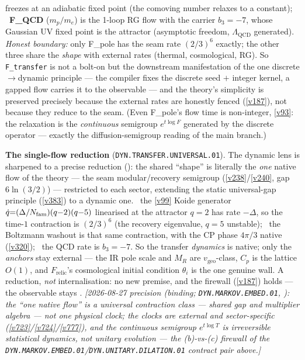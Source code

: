freezes at an adiabatic fixed point (the comoving number relaxes to a constant); \mE\ \textbf{F\_QCD} ($m_p/m_e$)
is the 1-loop RG flow with the carrier $b_3{=}-7$, whose Gaussian UV fixed point is the attractor (asymptotic
freedom, $\Lambda_{\mathrm{QCD}}$ generated). \emph{Honest boundary:} only F\_pole has the seam rate $(2/3)^6$
exactly; the other three share the \emph{shape} with external rates (thermal, cosmological, RG). So
\texttt{F\_transfer} is not a bolt-on but the downstream manifestation of the one discrete$\to$dynamic principle
--- the compiler fixes the discrete seed $+$ integer kernel, a gapped flow carries it to the observable --- and
the theory's simplicity is preserved precisely because the external rates are honestly fenced (\vref{v187}), not
because they reduce to the seam. (Even F\_pole's flow time is non-integer, \vref{v93}: the relaxation is the
\emph{continuous} semigroup $e^{t\log F}$ generated by the discrete operator --- exactly the diffusion-semigroup
reading of the main branch.)
\par\smallskip\noindent\textbf{The single-flow reduction} (\texttt{DYN.TRANSFER.UNIVERSAL.01}). The dynamic
lens is sharpened to a precise reduction (): the shared
``shape'' is literally the \emph{one} native flow of the theory --- the seam modular/recovery semigroup
(\vref{v238}/\vref{v240}, gap $6\ln(3/2)$) --- restricted to each sector, extending the static
universal-gap principle (\vref{v383}) to a dynamic one. \mE\ the \vref{v99} Koide generator
$\dot q{=}(\Delta/N_{\mathrm{fam}})(q{-}2)(q{-}5)$ linearised at the attractor $q{=}2$ has rate $-\Delta$, so the
time-$1$ contraction is $(2/3)^6$ (the recovery eigenvalue, $q{=}5$ unstable); \mE\ the Boltzmann washout
is that same contraction, with the CP phase $4\pi/3$ native (\vref{v320}); \mE\ the QCD rate is
$b_3{=}-7$. So the transfer \emph{dynamics} is native; only the \emph{anchors} stay external --- the IR
pole scale and $M_R$ are $v_{\mathrm{geo}}$-class, $C_p$ is the lattice $O(1)$, and $F_{\mathrm{relic}}$'s
cosmological initial condition $\theta_i$ is the one genuine wall. A reduction, \emph{not} internalisation:
no new premise, and the firewall (\vref{v187}) holds --- the observable stays \mC.
\emph{[2026-08-27 precision (binding; \texttt{DYN.MARKOV.EMBED.01},
): the ``one native flow'' is a universal
\emph{contraction class} --- shared gap and multiplier algebra --- not one physical clock; the
clocks are external and sector-specific (\vref{v723}/\vref{v724}/\vref{v777}), and the
continuous semigroup $e^{t\log T}$ is irreversible statistical dynamics, not unitary evolution
--- the (b)-vs-(c) firewall of the
\texttt{DYN.MARKOV.EMBED.01}/\texttt{DYN.UNITARY.DILATION.01} contract pair above.]}
